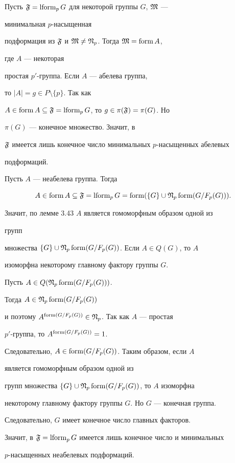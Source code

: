 \begin{pf} Пусть $\frak F=\operatorname{lform}_pG$ для некоторой группы $G$, $\frak M$ --- 


минимальная $p$-насыщенная 


подформация из $\frak F$ и $\frak M\ne\frak N_p$. Тогда $\frak M=\operatorname{form} A$, 


где $A$ --- некоторая 


простая $p'$-группа. Если $A$ --- абелева группа, 


то $|A|=g\in P\setminus\{p\}$. Так как 


$A\in\operatorname{form} A\subseteq\frak F=\operatorname{lform}_pG$, то $g\in\pi(\frak F)=\pi(G)$. Но 


$\pi(G)$ --- конечное множество. Значит, в 


$\frak F$ имеется лишь конечное число минимальных $p$-насыщенных абелевых 


подформаций. 


 


Пусть $A$ --- неабелева группа. Тогда 


$$ 


A\in\form A\subseteq\frak F=\lform_pG= 


\form(\{G\}\cup\frak N_p\form(G/F_p(G))). 


$$ 


Значит, по лемме 3.43 \cite{She3} $A$ является гомоморфным образом одной из 


групп 


множества $\{G\}\cup\frak N_p\operatorname{form}(G/F_p(G))$. Если $A\in Q(G)$, то $A$ 


изоморфна некоторому главному фактору группы $G$. 


Пусть $A\in Q(\frak N_p\operatorname{form}(G/F_p(G)))$. 


Тогда $A\in\frak N_p\operatorname{form}(G/F_p(G))$ 


и поэтому $A^{\operatorname{form}(G/F_p(G))}\in\frak N_p$. Так как $A$ --- простая 


$p'$-группа, то $A^{\operatorname{form}(G/F_p(G))}=1$. 


Следовательно, $A\in\operatorname{form}(G/F_p(G))$. Таким образом, если $A$ 


является гомоморфным образом одной из 


групп множества $\{G\}\cup\frak N_p\operatorname{form}(G/F_p(G))$, то $A$ изоморфна 


некоторому главному фактору группы $G$. Но $G$ --- конечная группа. 


Следовательно, $G$ имеет конечное число главных факторов. 


Значит, в $\frak F=\operatorname{lform}_pG$ имеется лишь конечное число и минимальных 


$p$-насыщенных неабелевых подформаций.


\end{pf} 


